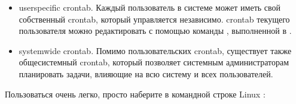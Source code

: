 \documentclass[letterpaper,10pt,russian]{sphinxmanual}
\begin{document}
\begin{sphinxVerbatim}[commandchars=\\\{\}]
                       
                      
                         
                         
                            
\end{sphinxVerbatim}
\begin{itemize}
\item {} 
\sphinxAtStartPar
user\sphinxhyphen{}specific crontab. Каждый пользователь в системе может иметь свой собственный crontab, который управляется независимо. crontab текущего пользователя можно редактировать с помощью команды , выполненной в .

\item {} 
\sphinxAtStartPar
system\sphinxhyphen{}wide crontab. Помимо пользовательских crontab, существует также общесистемный crontab, который позволяет системным администраторам планировать задачи, влияющие на всю систему и всех пользователей.

\end{itemize}

\sphinxAtStartPar
Пользоваться  очень легко, просто наберите в командной строке Linux :

\sphinxAtStartPar
{}
\end{document}

